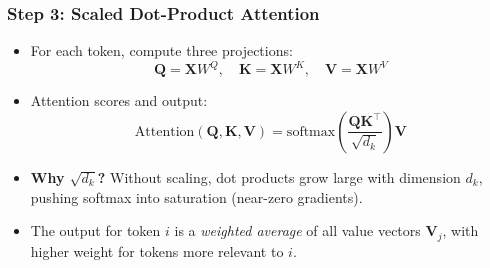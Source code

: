 \begin{frame}[fragile]\frametitle{Step 3: Scaled Dot-Product Attention}
\begin{itemize}
\item For each token, compute three projections:
\[
  \mathbf{Q} = \mathbf{X}W^Q, \quad \mathbf{K} = \mathbf{X}W^K, \quad \mathbf{V} = \mathbf{X}W^V
\]
\item Attention scores and output:
\[
  \text{Attention}(\mathbf{Q}, \mathbf{K}, \mathbf{V}) 
    = \text{softmax}\!\left(\frac{\mathbf{Q}\mathbf{K}^\top}{\sqrt{d_k}}\right)\mathbf{V}
\]
\item \textbf{Why $\sqrt{d_k}$?} Without scaling, dot products grow large with dimension $d_k$, pushing softmax into saturation (near-zero gradients).
\item The output for token $i$ is a \emph{weighted average} of all value vectors $\mathbf{V}_j$, with higher weight for tokens more relevant to $i$.
\end{itemize}
\end{frame}

